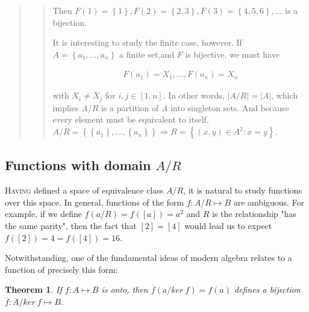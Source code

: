 \documentclass[a4paper, 12pt]{article}
\newtheorem{theorem}{Theorem}
\theoremstyle{definition}
\theoremstyle{definition}
\theoremstyle{definition}
\begin{document}
\begin{quote}
\begin{quote}
    Then $F(1) = \left\{ 1 \right\} , F(2) = \left\{ 2, 3 \right\}, F(3) =
    \left\{ 4, 5, 6 \right\}, \ldots  $ is a bijection.

    It is interesting to study the finite case, however. If $A = \left\{ a_1,
    \ldots, a_n \right\} $ a finite set,and $F$ is bijective, we must have

    \begin{align*}
        F(a_1) = X_1, \ldots, F(a_{n}) = X_{n}
    \end{align*}

    with $X_i \neq X_j$ for $i, j \in [1, n]$. In other words, $|A / R| = |A|$, which implies $A / R$
    is a partition of $A$ into singleton sets. And because every element must be
    equivalent to itself, $A / R = \left\{ \left\{ a_1 \right\}, \ldots, \left\{
    a_n\right\}   \right\} \Rightarrow R = \left\{ (x, y) \in A^2 : x = y
    \right\} $.


\end{quote}

\end{quote}
\normalsize
\pagebreak

\subsection{Functions with domain $A / R$}

\lettrine{H}{aving} defined a space of equivalence class $A / R$, it is natural 
to study functions over this space. In general, functions of the form $f : A /
R \mapsto B$ are ambiguous. For example, if we define $f(a / R) = f([a]) = a^2$
and $R$ is the relationship "has the same parity", then the fact that $[2] =
[4]$ would lead us to expect $f([2]) = 4 = f([4]) = 16$.

Notwithstanding, one of the fundamental ideas of modern algebra relates to a
function of precisely this form:

\begin{theorem}
    If $f : A \mapsto B$ is onto, then $\overline{f}(a / ker ~ f) = f(a)$
    defines a bijection $\overline{f} : A / ker ~ f \mapsto B$.
\end{theorem}
\end{document}
